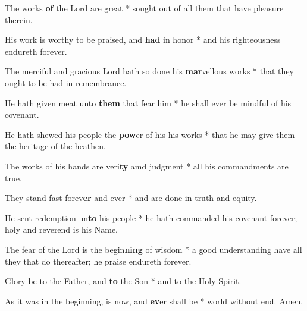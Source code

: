 \begin{multicols}{2}
	
	The works \textbf{of} the Lord are great * sought out of all them that have pleasure therein.
	
	His work is worthy to be praised, and \textbf{had} in honor * and his righteousness endureth forever.
	
	The merciful and gracious Lord hath so done his \textbf{mar}vellous works * that they ought to be had in remembrance.
	
	He hath given meat unto \textbf{them} that fear him * he shall ever be mindful of his covenant.
	
	He hath shewed his people the \textbf{pow}er of his his works * that he may give them the heritage of the heathen.
	
	The works of his hands are veri\textbf{ty} amd judgment * all his commandments are true.
	
	They stand fast forev\textbf{er} and ever * and are done in truth and equity.
	
	He sent redemption un\textbf{to} his people * he hath commanded his covenant forever; holy and reverend is his Name.
	
	The fear of the Lord is the begin\textbf{ning} of wisdom * a good understanding have all they that do thereafter; he praise endureth forever.
	
	Glory be to the Father, and \textbf{to} the Son * and to the Holy Spirit.
	
	As it was in the beginning, is now, and \textbf{ev}er shall be * world without end. Amen.
\end{multicols}